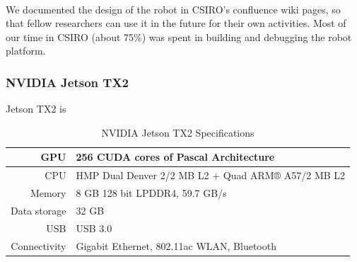 \paragraph{}
We documented the design of the robot in CSIRO's confluence wiki pages, so that fellow researchers can use it in the future for their own activities. Most of our time in CSIRO (about 75\%) was spent in building and debugging the robot platform. 


\subsubsection*{NVIDIA Jetson TX2}

Jetson TX2 is 

\begin{table}[H]
    \begin{center}
        \caption {NVIDIA Jetson TX2 Specifications} \label{tab:jetson}
        \begin{tabular}{|| r || l ||}    
            \hline
            GPU             & 256 CUDA cores of Pascal Architecture \\
            \hline
            CPU             & HMP Dual Denver 2/2 MB L2 + Quad ARM® A57/2 MB L2 \\
            \hline
            Memory          & 8 GB 128 bit LPDDR4, 59.7 GB/s \\
            \hline
            Data storage    & 32 GB \\
            \hline 
            USB             & USB 3.0 \\
            \hline 
            Connectivity    & Gigabit Ethernet, 802.11ac WLAN, Bluetooth \\
            \hline   
        \end{tabular}    
    \end{center}
\end{table}

